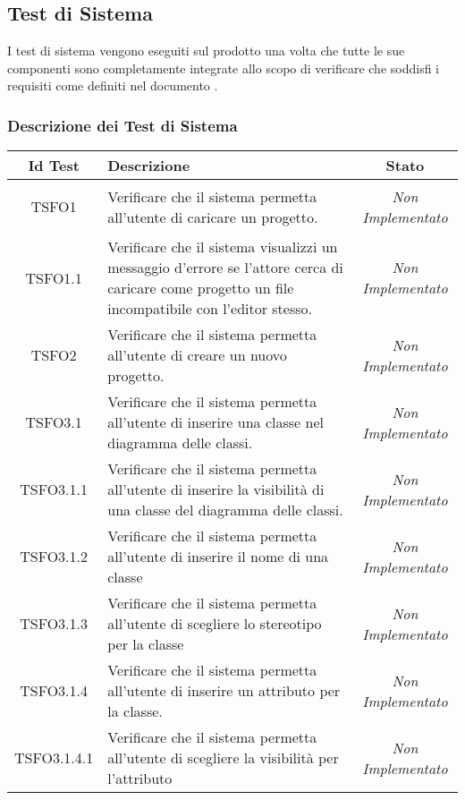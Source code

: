 \subsection{Test di Sistema}
I test di sistema vengono eseguiti sul prodotto una volta che tutte le sue componenti sono completamente integrate allo scopo di verificare che soddisfi i requisiti come definiti nel documento \AdR .

\subsubsection{Descrizione dei Test di Sistema}
\normalsize
\begin{longtable}{|c|>{}m{8cm}|c|}
\hline 
\textbf{Id Test} & \textbf{Descrizione} & \textbf{Stato}\\
\hline
\endhead
\hypertarget{TSFO1}{TSFO1} & Verificare che il sistema permetta all'utente di caricare un progetto. & \textit{Non Implementato}\\ \hline
\hypertarget{TSFO1.1}{TSFO1.1} & Verificare che il sistema visualizzi un messaggio d'errore se l'attore cerca di caricare come progetto un file incompatibile con l'editor stesso. & \textit{Non Implementato}\\ \hline
\hypertarget{TSFO2}{TSFO2} & Verificare che il sistema permetta all'utente di creare un nuovo progetto. & \textit{Non Implementato}\\ \hline
\hypertarget{TSFO3.1}{TSFO3.1} & Verificare che il sistema permetta all'utente di inserire una classe nel diagramma delle classi. & \textit{Non Implementato}\\ \hline
\hypertarget{TSFO3.1.1}{TSFO3.1.1} & Verificare che il sistema permetta all'utente di inserire la visibilità di una classe del diagramma delle classi. & \textit{Non Implementato}\\ \hline
\hypertarget{TSFO3.1.2}{TSFO3.1.2} & Verificare che il sistema permetta all'utente di inserire il nome di una classe & \textit{Non Implementato}\\ \hline
\hypertarget{TSFO3.1.3}{TSFO3.1.3} & Verificare che il sistema permetta all'utente di scegliere lo stereotipo per la classe & \textit{Non Implementato}\\ \hline
\hypertarget{TSFO3.1.4}{TSFO3.1.4} & Verificare che il sistema permetta all'utente di inserire un attributo per la classe. & \textit{Non Implementato}\\ \hline
\hypertarget{TSFO3.1.4.1}{TSFO3.1.4.1} & Verificare che il sistema permetta all'utente di scegliere la visibilità per l'attributo & \textit{Non Implementato}\\ \hline

\end{longtable}
